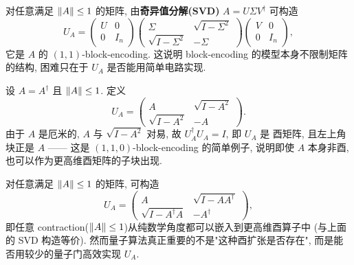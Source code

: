 \documentclass[utf8]{article} %
\numberwithin{equation}{section}   %
\newtheorem{Eg}{\hskip 2em {\color{black} 例}}[subsection]
\begin{document}
\begin{Eg}
    对任意满足 $\norm{A} \le 1$ 的矩阵, 由\textbf{奇异值分解(SVD)} $A = U\Sigma V^\dagger$ 可构造
    \begin{equation}
        U_A = \begin{pmatrix} U & 0 \\ 0 & I_n \end{pmatrix}
        \begin{pmatrix} \Sigma & \sqrt{I - \Sigma^2} \\ \sqrt{I - \Sigma^2} & -\Sigma \end{pmatrix}
        \begin{pmatrix} V & 0 \\ 0 & I_n \end{pmatrix},
    \end{equation}
    它是 $A$ 的 $(1,1)$-block-encoding. 这说明 block-encoding 的模型本身不限制矩阵的结构,
    困难只在于 $U_A$ 是否能用简单电路实现.
\end{Eg}

\begin{Eg}[厄米矩阵的酉扩张]
    设 $A = A^\dagger$ 且 $\norm{A} \le 1$. 定义
    \begin{equation}
        U_A = \begin{pmatrix} A & \sqrt{I - A^2} \\ \sqrt{I - A^2} & -A \end{pmatrix}.
    \end{equation}
    由于 $A$ 是厄米的, $A$ 与 $\sqrt{I-A^2}$ 对易, 故 $U_A^\dagger U_A = I$, 即 $U_A$ 是
    酉矩阵, 且左上角块正是 $A$ —— 这是 $(1,1,0)$-block-encoding 的简单例子, 说明即使
    $A$ 本身非酉, 也可以作为更高维酉矩阵的子块出现.
\end{Eg}

\begin{Eg}[一般矩阵的酉扩张]
    对任意满足 $\norm{A} \le 1$ 的矩阵, 可构造
    \begin{equation}
        U_A = \begin{pmatrix} A & \sqrt{I - AA^\dagger} \\ \sqrt{I - A^\dagger A} & -A^\dagger \end{pmatrix},
    \end{equation}
    即任意 contraction($\norm{A} \le 1$)从纯数学角度都可以嵌入到更高维酉算子中
    (与上面的 SVD 构造等价). 然而量子算法真正重要的不是"这种酉扩张是否存在",
    而是能否用较少的量子门高效实现 $U_A$.
\end{Eg}
\end{document}
